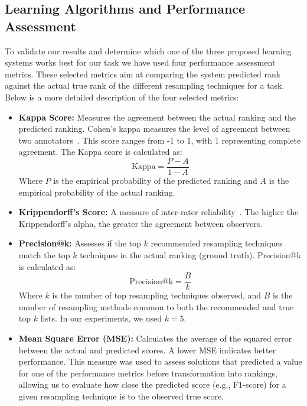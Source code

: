 \documentclass{article}
\begin{document}
\subsection{Learning Algorithms and Performance Assessment}
To validate our results and determine which one of the three proposed learning systems works best for our task we have used four performance assessment metrics. These selected metrics aim at comparing the system predicted rank against the actual true rank of the different resampling techniques for a task. Below is a more detailed description of the four selected metrics:
\begin{itemize}
\item \textbf{Kappa Score:} Measures the agreement between the actual ranking and the predicted ranking. Cohen's kappa measures the level of agreement between two annotators~\cite{cohenCoefficientAgreementNominal1960}. This score ranges from -1 to 1, with 1 representing complete agreement. The Kappa score is calculated as:
    \begin{equation}
        \text{Kappa} = \frac{P - A}{1 - A}
        \label{eq:kappa}
    \end{equation}
Where $P$ is the empirical probability of the predicted ranking and $A$ is the empirical probability of the actual ranking.

\item \textbf{Krippendorff's Score:} A measure of inter-rater reliability~\cite{hayesAnsweringCallStandard2007}. The higher the Krippendorff's alpha, the greater the agreement between observers.

\item \textbf{Precision@k:} Assesses if the top $k$ recommended resampling techniques match the top $k$ techniques in the actual ranking (ground truth). Precision@k is calculated as:
    \begin{equation}
        \text{Precision@k} = \frac{B}{k}
        \label{eq:precision}
    \end{equation}
Where $k$ is the number of top resampling techniques observed, and $B$ is the number of resampling methods common to both the recommended and true top $k$ lists. In our experiments, we used $k = 5$.

\item \textbf{Mean Square Error (MSE):} Calculates the average of the squared error between the actual and predicted scores. A lower MSE indicates better performance. This measure was used to assess solutions that predicted a value for one of the performance metrics before transformation into rankings, allowing us to evaluate how close the predicted score (e.g., F1-score) for a given resampling technique is to the observed true score.
\end{itemize}
\end{document}
